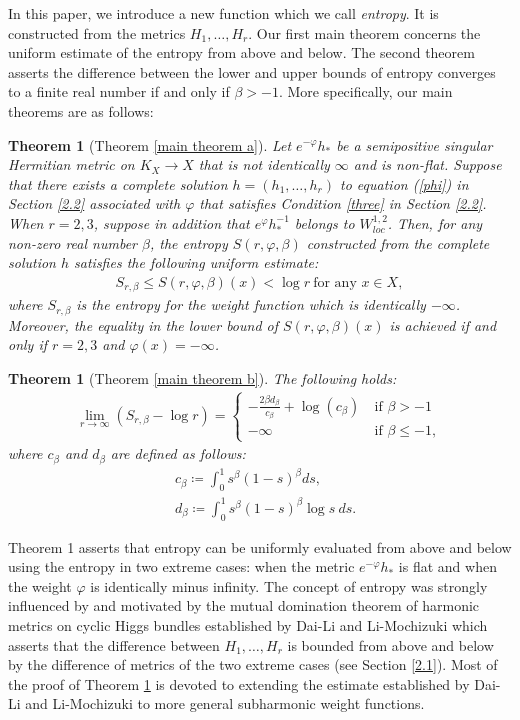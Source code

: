\documentclass[12pt]{article}
\theoremstyle{definition}
\newtheorem{theo}[defi]{Theorem}
\def\refe{\ast}
\begin{document}
In this paper, we introduce a new function which we call {\it entropy}. It is constructed from the metrics $H_1,\dots, H_r$. Our first main theorem concerns the uniform estimate of the entropy from above and below. The second theorem asserts the difference between the lower and upper bounds of entropy converges to a finite real number if and only if $\beta>-1$. More specifically, our main theorems are as follows: 
\begin{theo}[Theorem \ref{main theorem a}]\label{main theorem 1} {\it Let $e^{-\varphi}h_\refe$ be a semipositive singular Hermitian metric on $K_X\rightarrow X$ that is not identically $\infty$ and is non-flat. Suppose that there exists a complete solution $h=(h_1,\dots, h_r)$ to equation (\ref{phi}) in Section \ref{2.2} associated with $\varphi$ that satisfies Condition \ref{three} in Section \ref{2.2}. When $r=2,3$, suppose in addition that $e^{\varphi}h_\refe^{-1}$ belongs to $W^{1,2}_{loc}$.
Then, for any non-zero real number $\beta$, the entropy $S(r,\varphi, \beta)$ constructed from the complete solution $h$ satisfies the following uniform estimate:
\begin{align}
S_{r,\beta}\leq S(r,\varphi,\beta)(x)<\log r\ \text{for any $x\in X$}, \label{SrbSrp}
\end{align}
where $S_{r,\beta}$ is the entropy for the weight function which is identically $-\infty$. Moreover, the equality in the lower bound of $S(r,\varphi,\beta)(x)$ is achieved if and only if $r=2,3$ and $\varphi(x)=-\infty$. 
}
\end{theo}

\begin{theo}[Theorem \ref{main theorem b}]\label{main theorem 2} {\it The following holds:
\begin{align*}
\lim_{r\to\infty} (S_{r,\beta}-\log r)=
\begin{cases}
-\frac{2\beta d_\beta}{c_\beta}+\log(c_\beta) \ &\text{if $\beta>-1$} \\
-\infty \ &\text{if $\beta\leq -1$},
\end{cases}
\end{align*}
where $c_\beta$ and $d_\beta$ are defined as follows:
\begin{align*}
&c_\beta\coloneqq \int_0^1s^\beta(1-s)^\beta ds, \\
&d_\beta\coloneqq \int_0^1s^\beta(1-s)^\beta \log s\ ds.
\end{align*}
}
\end{theo}
Theorem 1 asserts that entropy can be uniformly evaluated from above and below using the entropy in two extreme cases: when the metric $e^{-\varphi}h_\refe$ is flat and when the weight $\varphi$ is identically minus infinity. The concept of entropy was strongly influenced by and motivated by the mutual domination theorem of harmonic metrics on cyclic Higgs bundles established by Dai-Li \cite{DL1, DL2} and Li-Mochizuki \cite{LM1} which asserts that the difference between $H_1,\dots, H_r$ is bounded from above and below by the difference of metrics of the two extreme cases (see Section \ref{2.1}). Most of the proof of Theorem \ref{main theorem 1} is devoted to extending the estimate established by Dai-Li and Li-Mochizuki to more general subharmonic weight functions.
\end{document}

